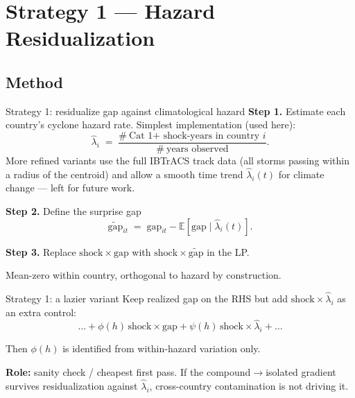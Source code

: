\documentclass[aspectratio=169]{beamer}
\begin{document}
\section{Strategy 1 --- Hazard Residualization}
\begin{frame}\sectionpage\end{frame}

\subsection{Method}
\begin{frame}\subsectionpage\end{frame}

\begin{frame}{Strategy 1: residualize gap against climatological hazard}
\textbf{Step 1.} Estimate each country's cyclone hazard rate. Simplest implementation (used here):
\[
  \hat\lambda_i \;=\; \frac{\#\ \text{Cat 1+ shock-years in country } i}{\#\ \text{years observed}}.
\]
More refined variants use the full IBTrACS track data (all storms passing within a radius of the centroid) and allow a smooth time trend $\hat\lambda_i(t)$ for climate change --- left for future work.

\medskip
\textbf{Step 2.} Define the surprise gap
\[
  \tilde{\mathrm{gap}}_{it} \;=\; \mathrm{gap}_{it} - \mathbb{E}[\mathrm{gap}\mid \hat\lambda_i(t)].
\]

\medskip
\textbf{Step 3.} Replace $\mathrm{shock}\times\mathrm{gap}$ with $\mathrm{shock}\times\tilde{\mathrm{gap}}$ in the LP.

\medskip
Mean-zero within country, orthogonal to hazard by construction.
\end{frame}

\begin{frame}{Strategy 1: a lazier variant}
Keep realized gap on the RHS but add $\mathrm{shock}\times\hat\lambda_i$ as an extra control:
\[
  \ldots + \phi(h)\,\mathrm{shock}\times\mathrm{gap}
         + \psi(h)\,\mathrm{shock}\times\hat\lambda_i + \ldots
\]

\medskip
Then $\phi(h)$ is identified from within-hazard variation only.

\medskip
\textbf{Role:} sanity check / cheapest first pass. If the compound$\to$isolated gradient survives residualization against $\hat\lambda_i$, cross-country contamination is not driving it.
\end{frame}
\end{document}
